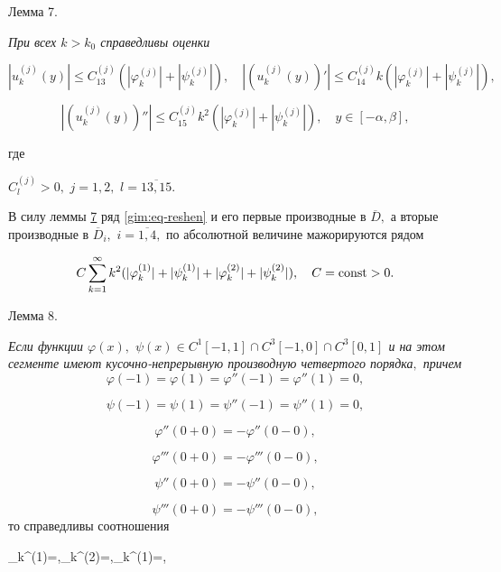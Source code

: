\smallskip



\hypertarget{gim:l7}{}



{\small\sc Лемма 7.} {\it При всех $k>k_0$ справедливы оценки

$$|u_k^{(j)}(y)|\le C^{(j)}_{13}(|\varphi_k^{(j)}|+|\psi_k^{(j)}|),\quad |(u_k^{(j)}(y))'|\le C^{(j)}_{14}k(|\varphi_k^{(j)}|+|\psi_k^{(j)}|),$$

$$|(u_k^{(j)}(y))''|\le C^{(j)}_{15}k^2(|\varphi_k^{(j)}|+|\psi_k^{(j)}|),\quad y\in[-\alpha,\beta],$$

где}  $C^{(j)}_{l}>0,$ $j=1, 2,$ $l=\overline{13, 15}.$



\smallskip



В силу леммы \hyperlink{gim:l7}{7} ряд \eqref{gim:eq-reshen} и его первые производные в $\overline D,$ а вторые производные в $\overline D_i,$ $i=\overline {1, 4},$ по абсолютной величине мажорируются рядом

\begin{gather*}

C\sum\limits_{k=1}^\infty k^2 (|\varphi_k^{(1)}|+|\psi_k^{(1)}|+|\varphi_k^{(2)}|+|\psi_k^{(2)}|),\quad  

C={\rm const}>0.

\end{gather*}



\smallskip





\hypertarget{gim:l8}{}

{\small\sc Лемма 8.} {\it Если функции $\varphi(x),$ $\psi(x)\in C^1[-1, 1]\cap C^3[-1, 0]\cap C^3[0, 1]$ и на этом сегменте имеют кусочно-непрерывную производную четвертого порядка$,$ причем $$\varphi(-1)=\varphi(1)=\varphi''(-1)=\varphi''(1)=0,$$ 

$$\psi(-1)=\psi(1)=\psi''(-1)=\psi''(1)=0,$$ 

$$\varphi''(0+0)=-\varphi''(0-0),$$ 

$$\varphi'''(0+0)=-\varphi'''(0-0),$$  

$$\psi''(0+0)=-\psi''(0-0),$$ 

$$\psi'''(0+0)=-\psi'''(0-0),$$ то справедливы соотношения}

$$\varphi_k^{(1)}=,\qquad \varphi_k^{(2)}=,\qquad \psi_k^{(1)}=,\qquad

